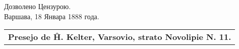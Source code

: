 \vspace*{12em}

\begin{table}[h]
\begin{center}
{\large Дозволено Цензурою. \\
\vspace{1ex}
Варшава, 18 Январа 1888 года.}
\end{center}

\end{table}

\setlength{\parskip}{0pt}

\vspace*{\fill}

\begin{flushright}
\begin{tabular}{r}
\hline
\bf\footnotesize Presejo de Ĥ. Kelter, Varsovio, strato Novolipie N. 11.
\end{tabular}
\end{flushright}

\vspace*{\fill}
